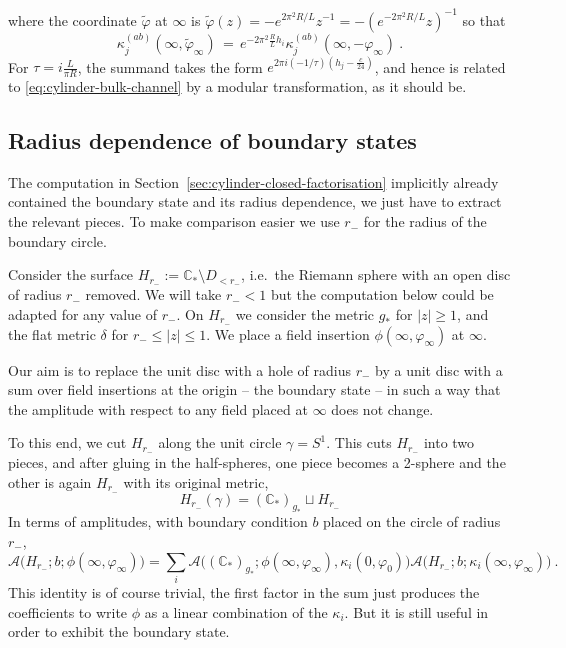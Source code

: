 \documentclass[11pt,a4paper]{article}
\numberwithin{equation}{section}
\begin{document}
where the coordinate $\tilde\varphi$ at $\infty$ is $\tilde\varphi(z) = - e^{2 \pi^2 R/L} z^{-1} = - (e^{-2 \pi^2 R/L}z)^{-1}$ so that
\begin{equation}
\kappa^{(ab)}_j(\infty,\tilde\varphi_\infty)
\,=\,
e^{-2 \pi^2 \frac{R}{L} h_i}
\kappa^{(ab)}_j(\infty,-\varphi_\infty)
\ .
\end{equation}
For $\tau = i \frac{L}{\pi R}$,
the summand takes the form $e^{2 \pi i (-1/\tau) (h_j - \frac{c}{24})}$, and hence is related to \eqref{eq:cylinder-bulk-channel} by a modular transformation, as it should be.


\subsection{Radius dependence of boundary states}
\label{eq:radius-bnd-state}

The computation in Section~\ref{sec:cylinder-closed-factorisation} implicitly already contained the boundary state and its radius dependence, we just have to extract the relevant pieces. To make comparison easier we use $r_-$ for the radius of the boundary circle.

Consider the surface $H_{r_-} := \mathbb{C}_* \setminus D_{<r_-}$, i.e.\ the Riemann sphere with an open disc of radius $r_-$ removed. We will take $r_-<1$ but the computation below could be adapted for any value of $r_-$.
On $H_{r_-}$ we consider the metric
$g_*$ for $|z| \ge 1$, and the flat metric $\delta$ for $r_- \le |z| \le 1$. We place a field insertion $\phi(\infty,\varphi_\infty)$ at $\infty$.

Our aim is to replace the unit disc with a hole of radius $r_-$ by a unit disc with a sum over field insertions at the origin -- the boundary state -- in such a way that the amplitude with respect to any field placed at $\infty$ does not change.

To this end, we cut $H_{r_-}$ along the unit circle $\gamma = S^1$. This cuts $H_{r_-}$ into two pieces, and after gluing in the half-spheres, one piece  becomes a 2-sphere and the other is again $H_{r_-}$ with its original metric,
\begin{equation}
    H_{r_-}(\gamma) = (\mathbb{C}_*)_{g_*} \sqcup H_{r_-}
\end{equation}
In terms of amplitudes, with boundary condition $b$ placed on the circle of radius $r_-$,
\begin{equation}\label{eq:bnd-state-aux1}
    \mathcal{A}\big(H_{r_-};b;\phi(\infty,\varphi_\infty)\big) 
= 
\sum_i 
\mathcal{A}\big((\mathbb{C}_*)_{g_*};\phi(\infty,\varphi_\infty),\kappa_i(0,\varphi_0)
    \big)
\mathcal{A}\big(H_{r_-};b;\kappa_i(\infty,\varphi_\infty)
    \big)    
 \ .
\end{equation}
This identity is of course trivial, the first factor in the sum just produces the coefficients to write $\phi$ as a linear combination of the $\kappa_i$. But it is still useful in order to exhibit the boundary state.
\end{document}
